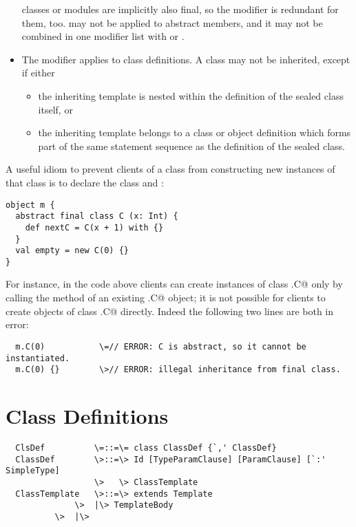 \documentclass[11pt]{report}
\begin{document}
\begin{itemize}
classes or modules are implicitly also final, so the \verb@final@
modifier is redundant for them, too.  \verb@final@ may not be applied
to abstract members, and it may not be combined in one modifier list with
\verb@private@ or \verb@sealed@.
\item
The \verb@sealed@ modifier applies to class definitions. A
\verb@sealed@ class may not be inherited, except if either
\begin{itemize}
\item
the inheriting template is nested within the definition of the sealed
class itself, or
\item
the inheriting template belongs to a class or object definition which
forms part of the same statement sequence as the definition of the
sealed class.
\end{itemize}
\end{itemize}

\example A useful idiom to prevent clients of a class from
constructing new instances of that class is to declare the class
\verb@final@ and \verb@abstract@:

\begin{verbatim}
object m {
  abstract final class C (x: Int) {
    def nextC = C(x + 1) with {}
  }
  val empty = new C(0) {}
}
\end{verbatim}
For instance, in the code above clients can create instances of class
\verb@m.C@ only by calling the \verb@nextC@ method of an existing \verb@m.C@
object; it is not possible for clients to create objects of class
\verb@m.C@ directly. Indeed the following two lines are both in error:

\begin{verbatim}
  m.C(0)           \=// ERROR: C is abstract, so it cannot be instantiated.
  m.C(0) {}        \>// ERROR: illegal inheritance from final class.
\end{verbatim}

\section{Class Definitions}
\label{sec:classes}

\syntax\begin{verbatim}
  ClsDef          \=::=\= class ClassDef {`,' ClassDef}
  ClassDef        \>::=\> Id [TypeParamClause] [ParamClause] [`:' SimpleType] 
                  \>   \> ClassTemplate
  ClassTemplate   \>::=\> extends Template
	          \>  |\> TemplateBody
		  \>  |\>
\end{verbatim}
\end{document}
